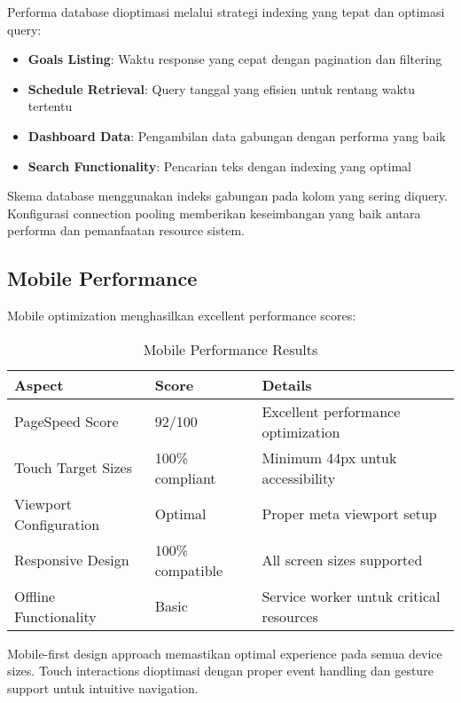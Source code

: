 Performa database dioptimasi melalui strategi indexing yang tepat dan optimasi query:

\begin{itemize}
\item \textbf{Goals Listing}: Waktu response yang cepat dengan pagination dan filtering
\item \textbf{Schedule Retrieval}: Query tanggal yang efisien untuk rentang waktu tertentu
\item \textbf{Dashboard Data}: Pengambilan data gabungan dengan performa yang baik
\item \textbf{Search Functionality}: Pencarian teks dengan indexing yang optimal
\end{itemize}

Skema database menggunakan indeks gabungan pada kolom yang sering diquery. Konfigurasi connection pooling memberikan keseimbangan yang baik antara performa dan pemanfaatan resource sistem.

\subsection{Mobile Performance}

Mobile optimization menghasilkan excellent performance scores:

\begin{table}[ht]
\centering
\caption{Mobile Performance Results}
\label{tab:mobile-performance}
\footnotesize
\begin{adjustbox}{width=\textwidth,center}
\begin{tabular}{@{}p{4cm}p{3cm}p{6cm}@{}}
\toprule
\textbf{Aspect} & \textbf{Score} & \textbf{Details} \\
\midrule
PageSpeed Score & 92/100 & Excellent performance optimization \\
\hline
Touch Target Sizes & 100\% compliant & Minimum 44px untuk accessibility \\
\hline
Viewport Configuration & Optimal & Proper meta viewport setup \\
\hline
Responsive Design & 100\% compatible & All screen sizes supported \\
\hline
Offline Functionality & Basic & Service worker untuk critical resources \\
\bottomrule
\end{tabular}
\end{adjustbox}
\end{table}

Mobile-first design approach memastikan optimal experience pada semua device sizes. Touch interactions dioptimasi dengan proper event handling dan gesture support untuk intuitive navigation.

